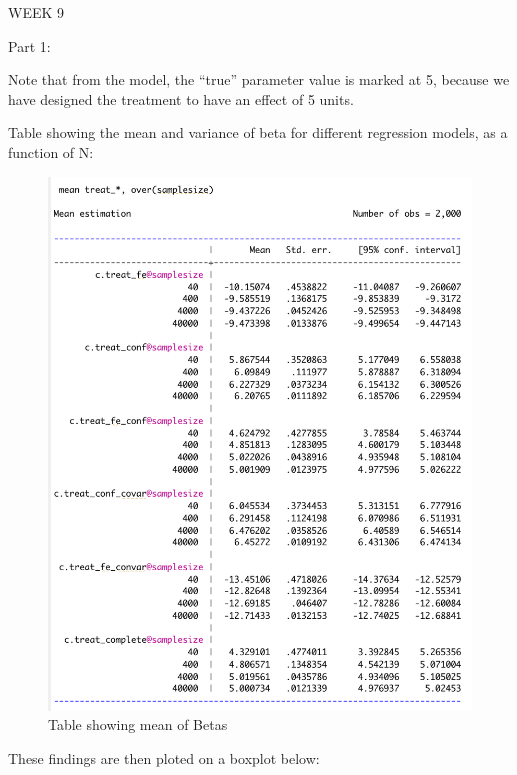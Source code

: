 \documentclass[
]{article}
\author{}
\date{\vspace{-2.5em}}
\begin{document}
WEEK 9

Part 1:

Note that from the model, the ``true'' parameter value is marked at 5,
because we have designed the treatment to have an effect of 5 units.

Table showing the mean and variance of beta for different regression
models, as a function of N:

\begin{figure}
\centering
\includegraphics{img/table1.png}
\caption{Table showing mean of Betas}
\end{figure}

These findings are then ploted on a boxplot below:
\end{document}
